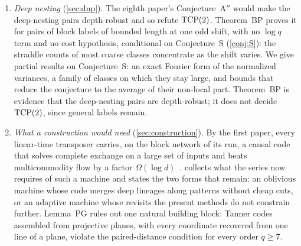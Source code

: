 \begin{enumerate}
for this oblivious, large-set form of transposition would refute (T) for every number of tapes (\cref{cor:EM}).
\item \emph{Deep nesting} (\cref{sec:dnp}). The eighth paper's Conjecture~A$''$ would make the deep-nesting pairs
depth-robust and so refute $\mathrm{TCP}(2)$. Theorem~BP proves it for pairs of block labels of bounded length at one odd shift,
with no $\log q$ term and no cost hypothesis, conditional on Conjecture~S (\cref{conj:S}): the straddle counts of most
coarse classes concentrate as the shift varies. We give partial results on Conjecture~S: an exact Fourier form of the
normalized variances, a family of classes on which they stay large, and bounds that reduce the conjecture to the average
of their non-local part. Theorem~BP is evidence that the deep-nesting pairs are depth-robust; it does not decide
$\mathrm{TCP}(2)$, since general labels remain.
\item \emph{What a construction would need} (\cref{sec:construction}). By the first paper, every linear-time transposer
carries, on the block network of its run, a causal code that solves complete exchange on a large set of inputs and
beats multicommodity flow by a factor $\Omega(\log d)$~\cite[Theorems~8.8 and~9.2]{FirstPaper2026}.  collects what the series now requires of
such a machine and states the two forms that remain: an oblivious machine whose code merges deep lineages along patterns
without cheap cuts, or an adaptive machine whose revisits the present methods do not constrain further. Lemma~PG rules
out one natural building block: Tanner codes assembled from projective planes, with every coordinate recovered from one
line of a plane, violate the paired-distance condition for every order $q\ge7$.
\end{enumerate}

